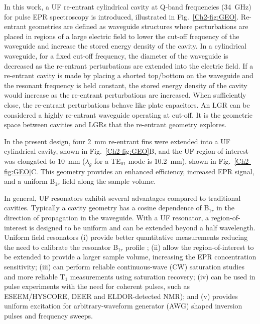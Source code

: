 In this work, a UF re-entrant cylindrical \cylTE{} cavity at Q-band frequencies (34~GHz) for pulse EPR spectroscopy is introduced, illustrated in Fig.~\ref{Ch2-fig:GEO}. Re-entrant geometries are defined as waveguide structures where perturbations are placed in regions of a large electric field to lower the cut-off frequency of the waveguide and increase the stored energy density of the cavity. \cite{ramo1984fields, MITRadWaveguide} In a cylindrical waveguide, for a fixed cut-off frequency, the diameter of the waveguide is decreased as the re-entrant perturbations are extended into the electric field. If a re-entrant cavity is made by placing a shorted top/bottom on the waveguide and the resonant frequency is held constant, the stored energy density of the cavity would increase as the re-entrant perturbations are increased. When sufficiently close, the re-entrant perturbations behave like plate capacitors. An LGR can be considered a highly re-entrant waveguide operating at cut-off. It is the geometric space between cavities and LGRs that the re-entrant geometry explores. 

In the present design, four 2~mm re-entrant fins were extended into a UF cylindrical \cylTE{} cavity, shown in Fig.~\ref{Ch2-fig:GEO}B, and the UF region-of-interest was elongated to 10~mm ($\lambda_g$ for a TE$_{01}$ mode is 10.2~mm), shown in Fig.~\ref{Ch2-fig:GEO}C. This geometry provides an enhanced efficiency, increased EPR signal, and a uniform B$_{1r}$ field along the sample volume.

In general, UF resonators exhibit several advantages compared to traditional cavities. Typically a cavity geometry has a cosine dependence of B$_{1r}$ in the direction of propagation in the waveguide. With a UF resonator, a region-of-interest is designed to be uniform and can be extended beyond a half wavelength. Uniform field resonators (i) provide better quantitative measurements reducing the need to calibrate the resonator B$_{1r}$ profile \cite{eaton2010quantitative}; (ii) allow the region-of-interest to be extended to provide a larger sample volume, increasing the EPR concentration sensitivity; (iii) can perform reliable continuous-wave (CW) saturation studies \cite{klugsdsl} and more reliable T$_1$ measurements using saturation recovery;  (iv) can be used in pulse experiments with the need for coherent pulses, such as ESEEM/HYSCORE, DEER\cite{pulsejeschke} and ELDOR-detected NMR\cite{COX201763}); and (v) provides uniform excitation for arbitrary-waveform generator (AWG) shaped inversion pulses \cite{stollshaped, shapedpulse} and frequency sweeps. \cite{DOLL201746}

